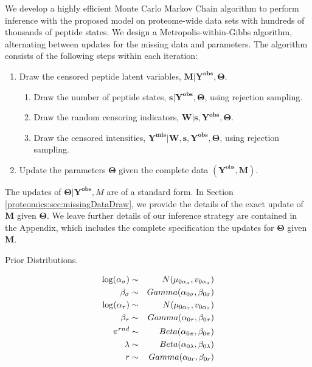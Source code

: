 We develop a highly efficient Monte Carlo Markov Chain algorithm to perform inference with the proposed model on proteome-wide data sets with hundreds of thousands of peptide states.
We design a Metropolis-within-Gibbs algorithm, alternating between updates for the missing data and parameters.
The algorithm consists of the following steps within each iteration:
%
\begin{enumerate}
\item Draw the censored peptide latent variables, $\mathbf{M}\vert\mathbf{Y^{obs}}, \bm \Theta$.

\begin{enumerate}
\item Draw the number of peptide states, $\bm s \vert \mathbf{Y^{obs}}, \bm \Theta$, using rejection sampling.
\item Draw the random censoring indicators, $\bm{W} \vert \bm s,  \mathbf{Y^{obs}}, \bm \Theta$.
\item Draw the censored intensities, $\mathbf{Y^{mis}} \vert \bm{W},\bm{s}, \bm{Y^{obs}}, \bm{\Theta}$, using rejection sampling.
\end{enumerate}
\item Update the parameters $\bm \Theta$ given the complete data $(\bm Y^\mathrm{obs}, \bm M)$.
\end{enumerate}
%
The updates of $\bm{\Theta} | \bm{Y^{obs}}, M$ are of a standard form.
In Section \ref{proteomics:sec:missingDataDraw}, we provide the details of the exact update of $\bm M$ given $\bm \Theta$.
We leave further details of our inference strategy are contained in the Appendix, which includes the complete specification the updates for $\bm \Theta$ given $\bm M$.

\ifx\nofigures\undefined
\begin{table}
\caption{Prior Distributions.}
\begin{eqnarray*}
\log(\alpha_\sigma) &\sim& N(\mu_{0 \alpha_\sigma}, v_{0 \alpha_\sigma}) \\
\beta_\sigma &\sim& Gamma(\alpha_{0 \sigma}, \beta_{0 \sigma}) \\
\log(\alpha_\tau) &\sim& N(\mu_{0 \alpha_\tau}, v_{0 \alpha_\tau}) \\
\beta_\tau &\sim& Gamma(\alpha_{0 \tau}, \beta_{0 \tau}) \\
\mbox{\ensuremath{\pi}}^{rnd} & \sim & Beta(\alpha_{0\pi}, \beta_{0\pi})\\
\lambda & \sim & Beta(\alpha_{0 \lambda}, \beta_{0 \lambda})\\
r & \sim & Gamma(\alpha_{0r}, \beta_{0r})
\end{eqnarray*}
\end{table}
\fi


